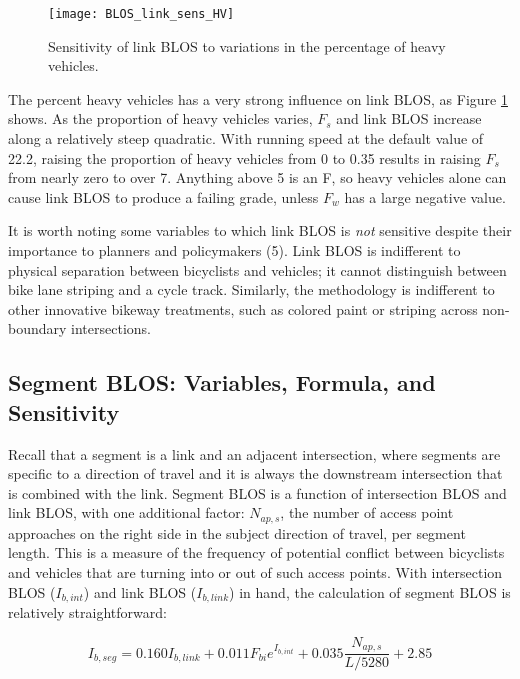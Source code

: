 \documentclass[11pt]{article} %
\begin{document}
\begin{figure}
\centering

\texttt{[image: BLOS\_link\_sens\_HV]}


\caption{Sensitivity of link BLOS to variations in the percentage of heavy vehicles.}

\label{fig:BLOS_link_sens_HV}

\end{figure}

The percent heavy vehicles has a very strong influence on link BLOS, as Figure \ref{fig:BLOS_link_sens_HV} shows. As the proportion of heavy vehicles varies, $F_s$ and link BLOS increase along a relatively steep quadratic. With running speed at the default value of 22.2, raising the proportion of heavy vehicles from 0 to 0.35 results in raising $F_s$ from nearly zero to over 7. Anything above 5 is an F, so heavy vehicles alone can cause link BLOS to produce a failing grade, unless $F_w$ has a large negative value. 

It is worth noting some variables to which link BLOS is \emph{not} sensitive despite their importance to planners and policymakers (5). Link BLOS is indifferent to physical separation between bicyclists and vehicles; it cannot distinguish between bike lane striping and a cycle track. Similarly, the methodology is indifferent to other innovative bikeway treatments, such as colored paint or striping across non-boundary intersections. 

\subsection{Segment BLOS: Variables, Formula, and Sensitivity}

Recall that a segment is a link and an adjacent intersection, where segments are specific to a direction of travel and it is always the downstream intersection that is combined with the link. Segment BLOS is a function of intersection BLOS and link BLOS, with one additional factor: $N_{ap,s}$, the number of access point approaches on the right side in the subject direction of travel, per segment length. This is a measure of the frequency of potential conflict between bicyclists and vehicles that are turning into or out of such access points. With intersection BLOS ($I_{b,int}$) and link BLOS ($I_{b,link}$) in hand, the calculation of segment BLOS is relatively straightforward:

$$ I_{b,seg} = 0.160 I_{b,link} +0.011F_{bi}e^{I_{b,int}} + 0.035 \frac{N_{ap,s}}{L/5280} + 2.85$$
\end{document}
